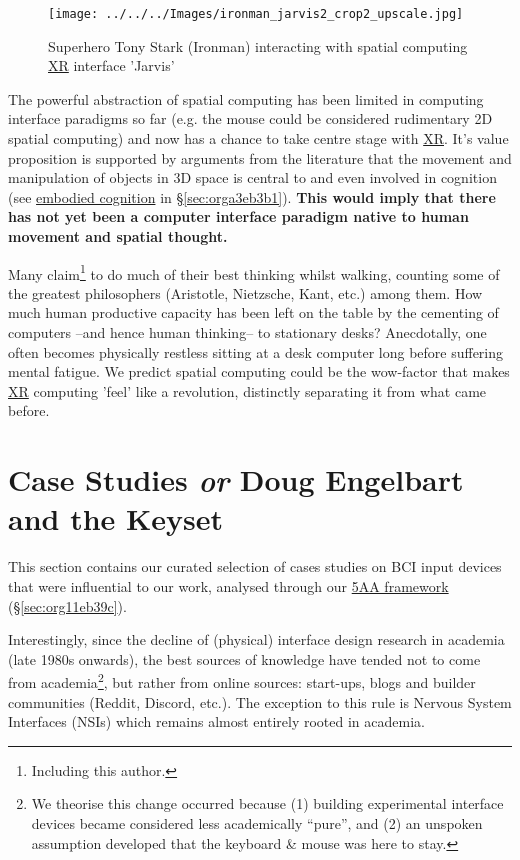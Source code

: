 \documentclass[logo,bsc,singlespacing,parskip]{infthesis}
\begin{document}
\begin{figure}[h]
\centering
\texttt{[image: ../../../Images/ironman\_jarvis2\_crop2\_upscale.jpg]}
\caption{Superhero Tony Stark (Ironman) interacting with spatial computing \hyperref[org53dbe83]{XR} interface 'Jarvis'}
\end{figure}

The powerful abstraction of spatial computing has been limited in computing interface paradigms so far (e.g. the mouse could be considered rudimentary 2D spatial computing) and now has a chance to take centre stage with \hyperref[org53dbe83]{XR}.
It's value proposition is supported by arguments from the literature that the movement and manipulation of objects in 3D space is central to and even involved in cognition (see \hyperref[org80caeb7]{embodied cognition} in \S \ref{sec:orga3eb3b1}).
\textbf{This would imply that there has not yet been a computer interface paradigm native to human movement and spatial thought.}

Many claim\footnote{Including this author.} to do much of their best thinking whilst walking, counting some of the greatest philosophers (Aristotle, Nietzsche, Kant, etc.) among them.
How much human productive capacity has been left on the table by the cementing of computers --and hence human thinking-- to stationary desks?
Anecdotally, one often becomes physically restless sitting at a desk computer long before suffering mental fatigue.
We predict spatial computing could be the wow-factor that makes \hyperref[org53dbe83]{XR} computing 'feel' like a revolution, distinctly separating it from what came before.

\chapter{Case Studies \emph{or} Doug Engelbart and the Keyset}
\label{sec:org8d4b58d}
This section contains our curated selection of cases studies on BCI input devices that were influential to our work, analysed through our \hyperref[sec:org11eb39c]{5AA framework} (\S \ref{sec:org11eb39c}).

Interestingly, since the decline of (physical) interface design research in academia (late 1980s onwards), the best sources of knowledge have tended not to come from academia\footnote{We theorise this change occurred because (1) building experimental interface devices became considered less academically ``pure'', and (2) an unspoken assumption developed that the keyboard \& mouse was here to stay.}, but rather from online sources: start-ups, blogs and builder communities (Reddit, Discord, etc.).
The exception to this rule is Nervous System Interfaces (NSIs) which remains almost entirely rooted in academia.
\end{document}
